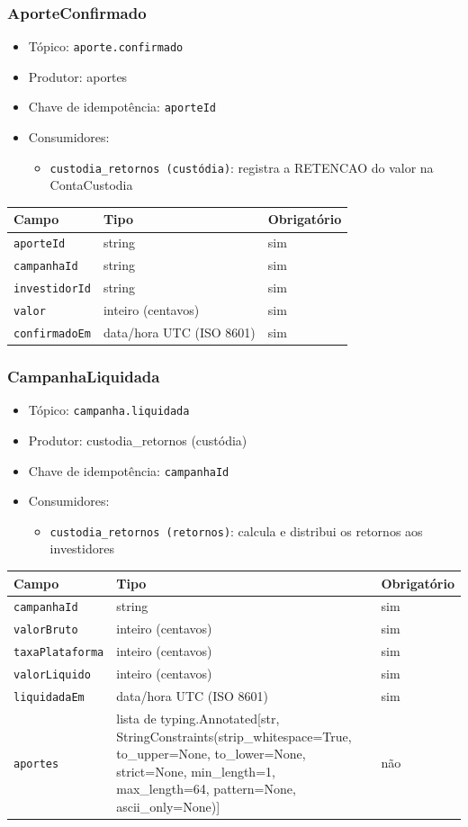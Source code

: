\subsubsection{AporteConfirmado}
\begin{itemize}
  \item Tópico: \texttt{aporte.confirmado}
  \item Produtor: aportes
  \item Chave de idempotência: \texttt{aporteId}
  \item Consumidores:
  \begin{itemize}
    \item \texttt{custodia\_retornos (custódia)}: registra a RETENCAO do valor na ContaCustodia
  \end{itemize}
\end{itemize}
\begin{tabular}{lll}
\hline
Campo & Tipo & Obrigatório \\
\hline
\texttt{aporteId} & string & sim \\
\texttt{campanhaId} & string & sim \\
\texttt{investidorId} & string & sim \\
\texttt{valor} & inteiro (centavos) & sim \\
\texttt{confirmadoEm} & data/hora UTC (ISO 8601) & sim \\
\hline
\end{tabular}

\subsubsection{CampanhaLiquidada}
\begin{itemize}
  \item Tópico: \texttt{campanha.liquidada}
  \item Produtor: custodia\_retornos (custódia)
  \item Chave de idempotência: \texttt{campanhaId}
  \item Consumidores:
  \begin{itemize}
    \item \texttt{custodia\_retornos (retornos)}: calcula e distribui os retornos aos investidores
  \end{itemize}
\end{itemize}
\begin{tabular}{lll}
\hline
Campo & Tipo & Obrigatório \\
\hline
\texttt{campanhaId} & string & sim \\
\texttt{valorBruto} & inteiro (centavos) & sim \\
\texttt{taxaPlataforma} & inteiro (centavos) & sim \\
\texttt{valorLiquido} & inteiro (centavos) & sim \\
\texttt{liquidadaEm} & data/hora UTC (ISO 8601) & sim \\
\texttt{aportes} & lista de typing.Annotated[str, StringConstraints(strip\_whitespace=True, to\_upper=None, to\_lower=None, strict=None, min\_length=1, max\_length=64, pattern=None, ascii\_only=None)] & não \\
\hline
\end{tabular}

